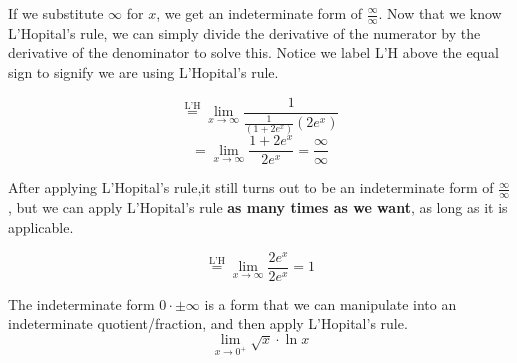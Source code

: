 \documentclass[12pt,fleqn]{book} %
\begin{document}

\noindent If we substitute $\infty$ for $x$, we get an indeterminate form of $\frac{\infty}{\infty}$. Now that we know L'Hopital's rule, we can simply divide the derivative of the
numerator by the derivative of the denominator to solve this. Notice we label L'H above the equal sign to signify we are using L'Hopital's rule.

    {\large\[ \stackrel{\text{L'H}}{=} \lim_{x \to \infty} \frac{1}{\frac{1}{(1+2e^x)}(2e^x)}\]
        \[ = \lim_{x \to \infty} \frac{1+2e^x}{2e^x} = \frac{\infty}{\infty}\]}

\noindent After applying L'Hopital's rule,it still turns out to be an indeterminate form of $\frac{\infty}{\infty}$, but we can apply L'Hopital's rule \textbf{as many times as we want}, as long
as it is applicable.

    {\large\[ \stackrel{\text{L'H}}{=} \lim_{x \to \infty} \frac{2e^x}{2e^x} = 1\]}


\noindent The indeterminate form $0 \cdot \pm \infty$ is a form that we can manipulate into an indeterminate quotient/fraction, and then apply L'Hopital's rule.
    {\large\[ \lim_{x \to 0^+} \sqrt{x} \cdot \ln{x} \]}
\end{document}
